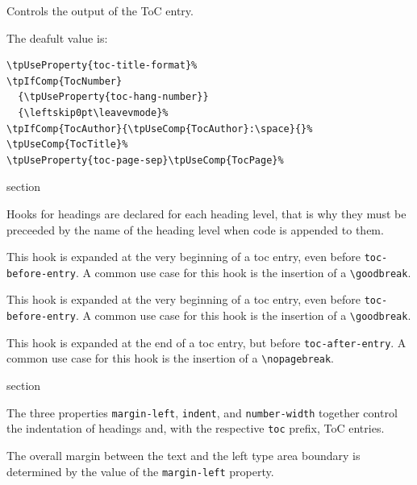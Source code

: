 
Controls the output of the ToC entry.

The deafult value is:
\begin{lstlisting}[style=tex]
\tpUseProperty{toc-title-format}%
\tpIfComp{TocNumber}
  {\tpUseProperty{toc-hang-number}}
  {\leftskip0pt\leavevmode}%
\tpIfComp{TocAuthor}{\tpUseComp{TocAuthor}:\space}{}%
\tpUseComp{TocTitle}%
\tpUseProperty{toc-page-sep}\tpUseComp{TocPage}%
\end{lstlisting}

\begin{heading}[label=sec:hdg:hooks]{section}
\end{heading}

Hooks for headings are declared for each heading level, that is why
they must be preceeded by the name of the heading level when code is
appended to them.


This hook is expanded at the very beginning of a toc entry, even
before \lstinline{toc-before-entry}.  A common use case for this hook
is the insertion of a \lstinline{\goodbreak}.


This hook is expanded at the very beginning of a toc entry, even
before \lstinline{toc-before-entry}.  A common use case for this hook
is the insertion of a \lstinline{\goodbreak}.


This hook is expanded at the end of a toc entry, but before
\lstinline{toc-after-entry}. A common use case for this hook is the
insertion of a \lstinline{\nopagebreak}.



\begin{heading}[label=sec:hdg:indent]{section}
\end{heading}

The three properties \lstinline{margin-left}, \lstinline{indent}, and
\lstinline{number-width} together control the indentation of headings
and, with the respective \lstinline{toc} prefix, ToC entries.

The overall margin between the text and the left type area boundary is
determined by the value of the \lstinline{margin-left} property.

